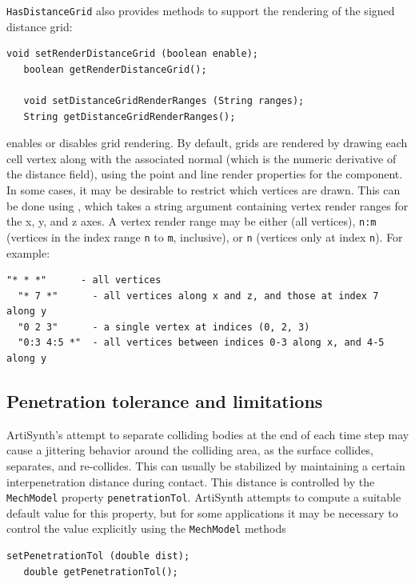 {\tt HasDistanceGrid} also provides methods to support the rendering
of the signed distance grid:
%
\begin{lstlisting}[]
   void setRenderDistanceGrid (boolean enable);
   boolean getRenderDistanceGrid();

   void setDistanceGridRenderRanges (String ranges);
   String getDistanceGridRenderRanges();
\end{lstlisting}
%
enables or disables grid rendering. By default, grids are rendered by
drawing each cell vertex along with the associated normal (which is
the numeric derivative of the distance field), using the point and
line render properties for the component. In some cases, it may be
desirable to restrict which vertices are drawn. This can be done using
, which takes a string argument
containing vertex render ranges for the x, y, and z axes.  A vertex
render range may be either {\tt *} (all vertices), {\tt n:m} (vertices
in the index range {\tt n} to {\tt m}, inclusive), or {\tt n}
(vertices only at index {\tt n}). For example:
%
\begin{lstlisting}[]
  "* * *"      - all vertices  
  "* 7 *"      - all vertices along x and z, and those at index 7 along y
  "0 2 3"      - a single vertex at indices (0, 2, 3)
  "0:3 4:5 *"  - all vertices between indices 0-3 along x, and 4-5 along y
\end{lstlisting}
%

\subsection{Penetration tolerance and limitations}
\label{ContactLimitations:sec}

ArtiSynth's attempt to separate colliding bodies at the end of each
time step may cause a jittering behavior around the colliding area, as
the surface collides, separates, and re-collides.  This can usually be
stabilized by maintaining a certain interpenetration distance during
contact. This distance is controlled by the {\tt MechModel} property
{\tt penetrationTol}.  ArtiSynth attempts to compute a suitable
default value for this property, but for some applications it may be
necessary to control the value explicitly using the {\tt MechModel}
methods
%
\begin{lstlisting}[]
   setPenetrationTol (double dist);
   double getPenetrationTol();
\end{lstlisting}
%

